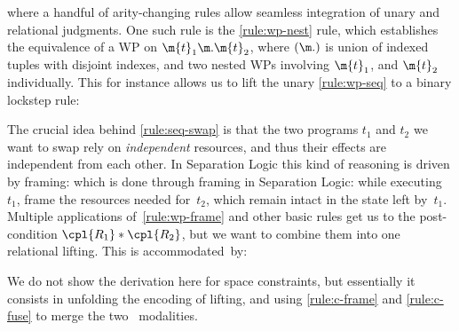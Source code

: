 \documentclass[acmsmall,nonacm,screen,appendix]{acmart}
\begin{document}
where a handful of arity-changing rules allow seamless integration
of unary and relational judgments.
One such rule is the \ref{rule:wp-nest} rule, which
establishes the equivalence of a WP on $ \m{t}_1 \m. \m{t}_2 $,
where $(\m.)$ is union of indexed tuples with disjoint indexes,
and two nested WPs involving $\m{t}_1$, and $\m{t}_2$ individually.
This for instance allows us to lift the unary \ref{rule:wp-seq}
to a binary lockstep rule:
\begin{derivation}
\end{derivation}

The crucial idea behind \ref{rule:seq-swap} is that the two programs
$t_1$ and $t_2$ we want to swap rely on \emph{independent} resources,
and thus their effects are independent from each other.
In Separation Logic this kind of reasoning is driven by framing:
which is done through framing in Separation Logic:
while executing~$t_1$, frame the resources
needed for~$t_2$, which remain intact in the state left by~$t_1$.
Multiple applications of~\ref{rule:wp-frame} and other basic rules
get us to the post-condition $\cpl{R_1} \ast \cpl{R_2}$, but
we want to combine them into one relational lifting.
This is accommodated~by:
\begin{proofrule}
%
   \label{rule:rl-merge}
\end{proofrule}
We do not show the derivation here for space constraints,
but essentially it consists in unfolding the encoding of lifting,
and using \ref{rule:c-frame} and \ref{rule:c-fuse}
to merge the two \supercond\ modalities.
\end{document}
